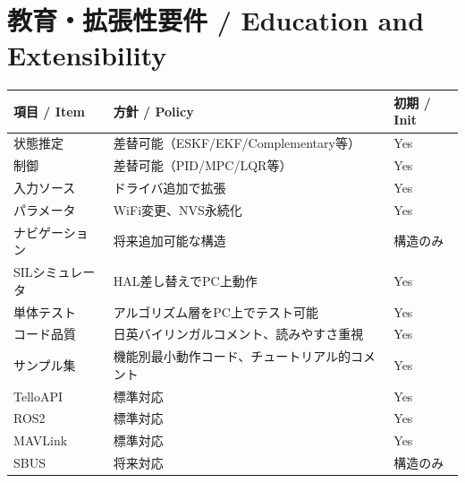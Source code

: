 \documentclass[a4paper,11pt]{article}
\newcommand{\thead}[1]{\textbf{\color{accentdark}#1}}
\begin{document}
\section{教育・拡張性要件 / Education and Extensibility}

\begin{table}[h]
\centering
\begin{tabular}{@{}lll@{}}
\toprule
\thead{項目 / Item} & \thead{方針 / Policy} & \thead{初期 / Init} \\
\midrule
状態推定 & 差替可能（ESKF/EKF/Complementary等） & Yes \\
制御 & 差替可能（PID/MPC/LQR等） & Yes \\
入力ソース & ドライバ追加で拡張 & Yes \\
パラメータ & WiFi変更、NVS永続化 & Yes \\
ナビゲーション & 将来追加可能な構造 & 構造のみ \\
SILシミュレータ & HAL差し替えでPC上動作 & Yes \\
単体テスト & アルゴリズム層をPC上でテスト可能 & Yes \\
コード品質 & 日英バイリンガルコメント、読みやすさ重視 & Yes \\
サンプル集 & 機能別最小動作コード、チュートリアル的コメント & Yes \\
TelloAPI & 標準対応 & Yes \\
ROS2 & 標準対応 & Yes \\
MAVLink & 標準対応 & Yes \\
SBUS & 将来対応 & 構造のみ \\
\bottomrule
\end{tabular}
\end{table}
\end{document}
